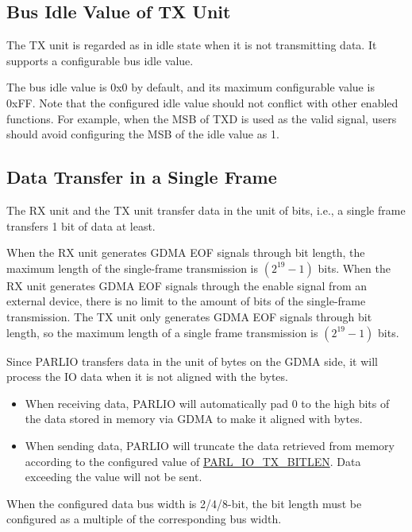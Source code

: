 \documentclass[main\_\_EN.tex]{subfiles}
\begin{document}
\subsection{Bus Idle Value of TX Unit}
The TX unit is regarded as in idle state when it is not transmitting data. It supports a configurable bus idle value.

The bus idle value is 0x0 by default, and its maximum configurable value is 0xFF. Note that the configured idle value should not conflict with other enabled functions. For example, when the MSB of TXD is used as the valid signal, users should avoid configuring the MSB of the idle value as 1.


\subsection{Data Transfer in a Single Frame}

The RX unit and the TX unit transfer data in the unit of bits, i.e., a single frame transfers 1 bit of data at least.

When the RX unit generates GDMA EOF signals through bit length, the maximum length of the single-frame transmission is \begin{math} (2^{19}-1) \end{math} bits. When the RX unit generates GDMA EOF signals through the enable signal from an external device, there is no limit to the amount of bits of the single-frame transmission. The TX unit only generates GDMA EOF signals through bit length, so the maximum length of a single frame transmission is \begin{math} (2^{19}-1) \end{math} bits.

Since PARLIO transfers data in the unit of bytes on the GDMA side, it will process the IO data when it is not aligned with the bytes.

\begin{itemize}
    \item When receiving data, PARLIO will automatically pad 0 to the high bits of the data stored in memory via GDMA to make it aligned with bytes.
    \item When sending data, PARLIO will truncate the data retrieved from memory according to the configured value of \hyperref[fielddesc:PARLIOTXBITLEN]{PARL\_IO\_TX\_BITLEN}. Data exceeding the value will not be sent. 
\end{itemize}

When the configured data bus width is 2/4/8-bit, the bit length must be configured as a multiple of the corresponding bus width.
\end{document}
